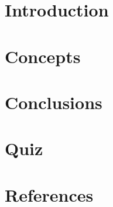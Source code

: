 \section[Intro]{Introduction}


\section[Concepts]{Concepts}


\section[Conclusions]{Conclusions}


\section[QnA]{Quiz}


\section[Refs]{References}
